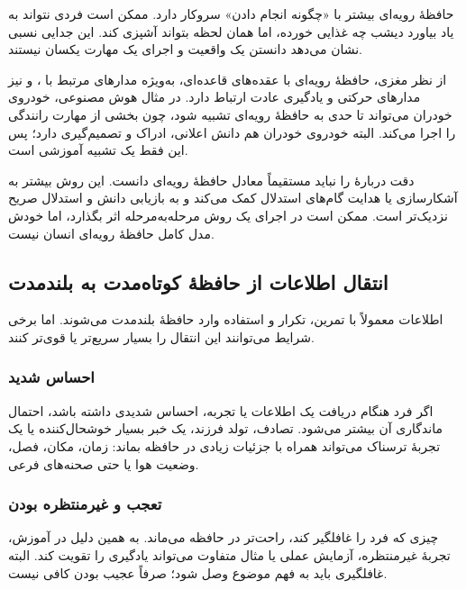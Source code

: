 حافظهٔ رویه‌ای بیشتر با «چگونه انجام دادن» سروکار دارد. ممکن است فردی نتواند به یاد بیاورد دیشب چه غذایی خورده، اما همان لحظه بتواند آشپزی کند. این جدایی نسبی نشان می‌دهد دانستن یک واقعیت و اجرای یک مهارت یکسان نیستند.

از نظر مغزی، حافظهٔ رویه‌ای با عقده‌های قاعده‌ای، به‌ویژه مدارهای مرتبط با ، و نیز مدارهای حرکتی و یادگیری عادت ارتباط دارد. در مثال هوش مصنوعی، خودروی خودران می‌تواند تا حدی به حافظهٔ رویه‌ای تشبیه شود، چون بخشی از مهارت رانندگی را اجرا می‌کند. البته خودروی خودران هم دانش اعلانی، ادراک و تصمیم‌گیری دارد؛ پس این فقط یک تشبیه آموزشی است.


\begin{correctionbox}{دقت دربارهٔ }
 را نباید مستقیماً معادل حافظهٔ رویه‌ای دانست. این روش بیشتر به آشکارسازی یا هدایت گام‌های استدلال کمک می‌کند و به بازیابی دانش و استدلال صریح نزدیک‌تر است. ممکن است در اجرای یک روش مرحله‌به‌مرحله اثر بگذارد، اما خودش مدل کامل حافظهٔ رویه‌ای انسان نیست.
\end{correctionbox}

\subsection{انتقال اطلاعات از حافظهٔ کوتاه‌مدت به بلندمدت}
اطلاعات معمولاً با تمرین، تکرار و استفاده وارد حافظهٔ بلندمدت می‌شوند. اما برخی شرایط می‌توانند این انتقال را بسیار سریع‌تر یا قوی‌تر کنند.

\subsubsection{احساس شدید}
اگر فرد هنگام دریافت یک اطلاعات یا تجربه، احساس شدیدی داشته باشد، احتمال ماندگاری آن بیشتر می‌شود. تصادف، تولد فرزند، یک خبر بسیار خوشحال‌کننده یا یک تجربهٔ ترسناک می‌تواند همراه با جزئیات زیادی در حافظه بماند: زمان، مکان، فصل، وضعیت هوا یا حتی صحنه‌های فرعی.

\subsubsection{تعجب و غیرمنتظره بودن}
چیزی که فرد را غافلگیر کند، راحت‌تر در حافظه می‌ماند. به همین دلیل در آموزش، تجربهٔ غیرمنتظره، آزمایش عملی یا مثال متفاوت می‌تواند یادگیری را تقویت کند. البته غافلگیری باید به فهم موضوع وصل شود؛ صرفاً عجیب بودن کافی نیست.

